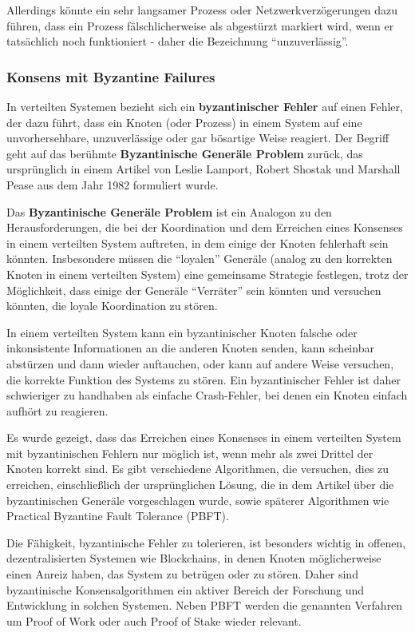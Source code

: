 Allerdings könnte ein sehr langsamer Prozess oder Netzwerkverzögerungen dazu führen, dass ein Prozess fälschlicherweise als abgestürzt markiert wird, wenn er tatsächlich noch funktioniert - daher die Bezeichnung \enquote{unzuverlässig}.

\subsubsection{Konsens mit Byzantine Failures}
In verteilten Systemen bezieht sich ein \textbf{byzantinischer Fehler} auf einen Fehler, der dazu führt, dass ein Knoten (oder Prozess) in einem System auf eine unvorhersehbare, unzuverlässige oder gar bösartige Weise reagiert. Der Begriff geht auf das berühmte \textbf{Byzantinische Generäle Problem} zurück, das ursprünglich in einem Artikel von Leslie Lamport, Robert Shostak und Marshall Pease aus dem Jahr 1982 formuliert wurde.

Das \textbf{Byzantinische Generäle Problem} ist ein Analogon zu den Herausforderungen, die bei der Koordination und dem Erreichen eines Konsenses in einem verteilten System auftreten, in dem einige der Knoten fehlerhaft sein könnten. Insbesondere müssen die \enquote{loyalen} Generäle (analog zu den korrekten Knoten in einem verteilten System) eine gemeinsame Strategie festlegen, trotz der Möglichkeit, dass einige der Generäle \enquote{Verräter} sein könnten und versuchen könnten, die loyale Koordination zu stören.

In einem verteilten System kann ein byzantinischer Knoten falsche oder inkonsistente Informationen an die anderen Knoten senden, kann scheinbar abstürzen und dann wieder auftauchen, oder kann auf andere Weise versuchen, die korrekte Funktion des Systems zu stören. Ein byzantinischer Fehler ist daher schwieriger zu handhaben als einfache Crash-Fehler, bei denen ein Knoten einfach aufhört zu reagieren.

Es wurde gezeigt, dass das Erreichen eines Konsenses in einem verteilten System mit byzantinischen Fehlern nur möglich ist, wenn mehr als zwei Drittel der Knoten korrekt sind. Es gibt verschiedene Algorithmen, die versuchen, dies zu erreichen, einschließlich der ursprünglichen Lösung, die in dem Artikel über die byzantinischen Generäle vorgeschlagen wurde, sowie späterer Algorithmen wie Practical Byzantine Fault Tolerance (PBFT).

Die Fähigkeit, byzantinische Fehler zu tolerieren, ist besonders wichtig in offenen, dezentralisierten Systemen wie Blockchains, in denen Knoten möglicherweise einen Anreiz haben, das System zu betrügen oder zu stören. Daher sind byzantinische Konsensalgorithmen ein aktiver Bereich der Forschung und Entwicklung in solchen Systemen. Neben PBFT werden die genannten Verfahren um Proof of Work oder auch Proof of Stake wieder relevant.  

